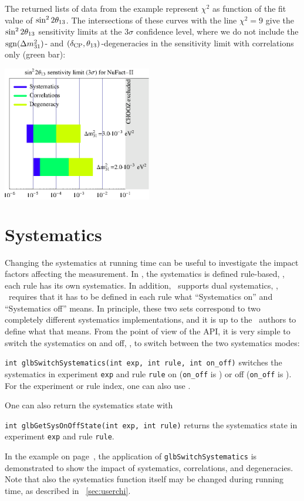 {The returned lists of data from the example represent $\chi^2$ 
as function of the fit value of $\sin^2 2 \theta_{13}$. The intersections of these
curves with the line $\chi^2 = 9$ give the $\sin^2 2 \theta_{13}$ sensitivity
limits at the $3 \sigma$ confidence level, where we do not include the
 $\mathrm{sgn}(\Delta m_{31}^2)$- and $(\delta_{\mathrm{CP}},\theta_{13})$-degeneracies in the sensitivity limit with correlations only (green bar):
\begin{center}
\colorbox{white}{\includegraphics[width=6.5cm]{barsex}}
\end{center}
}

\section{Systematics}
\label{sec:systematics}

Changing the systematics at running time can be useful to investigate
the impact factors affecting the measurement.
In \GLOBES , the systematics is defined rule-based, \ie, each rule
has its own systematics. 
In addition, \GLOBES\ supports dual systematics, \ie, \AEDL\ requires that it has to be
defined in each rule what ``Systematics on'' and ``Systematics off'' means.
In principle, these two sets correspond to two completely different systematics
implementations, and it is up to the \AEDL\ authors to define what that means.
From the point of view of the API, it is very simple to switch the systematics on and off, \ie,
to switch between the two systematics modes:
\begin{function}
{\tt int glbSwitchSystematics(int exp, int rule, int on\_off)}
switches the systematics in experiment {\tt exp} and rule {\tt rule}
on ({\tt on\_off} is ) or off ({\tt on\_off} is ). For the experiment or
rule index, one can also use . 
\end{function}
One can also return the systematics state with
\begin{function}
{\tt int glbGetSysOnOffState(int exp, int rule)}
returns the systematics state in experiment {\tt exp} and rule {\tt rule}. 
\end{function}
In the example on page~\pageref{ex:barcharts}, the application of
{\tt glbSwitchSystematics} is demonstrated to show the impact of
systematics, correlations, and degeneracies.
Note that also the systematics function itself may be changed during running time,
as described in \Sec~\ref{sec:userchi}.

